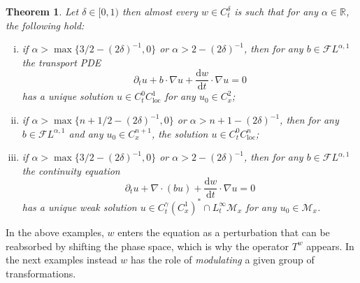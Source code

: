 \documentclass[10pt]{article}
\newcommand{\mathd}{\mathrm{d}}
\newcommand{\tmop}[1]{\ensuremath{\operatorname{#1}}}
\newcommand{\tmtextit}[1]{{\itshape{#1}}}
\newenvironment{enumerateroman}{\begin{enumerate}[i.] }{\end{enumerate}}
\newtheorem{theorem}{Theorem}
\begin{document}
\begin{theorem}
  Let $\delta \in [0, 1)$ then almost every $w \in C^{\delta}_t$ is such that
  for any $\alpha \in \mathbb{R}$, the following hold:
  \begin{enumerateroman}
    \item if $\alpha > \max \{ 3 / 2 - (2 \delta)^{- 1}, 0 \}$ or $\alpha > 2
    - (2 \delta)^{- 1}$, then for any $b \in \mathcal{F} L^{\alpha, 1}$ the
    transport PDE
    \[ \partial_t u + b \cdot \nabla u + \frac{\mathd w}{\mathd t} \cdot
       \nabla u = 0 \]
    has a unique solution $u \in C^0_t C^1_{\tmop{loc}}$ for any $u_0 \in
    C^2_x$;
    
    \item if $\alpha > \max \{ n + 1 / 2 - (2 \delta)^{- 1}, 0 \}$ or $\alpha
    > n + 1 - (2 \delta)^{- 1}$, then for any $b \in \mathcal{F} L^{\alpha,
    1}$ and any $u_0 \in C^{n + 1}_x$, the solution $u \in C^0_t
    C^n_{\tmop{loc}}$;
    
    \item if $\alpha > \max \{ 3 / 2 - (2 \delta)^{- 1}, 0 \}$ or $\alpha > 2
    - (2 \delta)^{- 1}$, then for any $b \in \mathcal{F} L^{\alpha, 1}$ the
    continuity equation
    \[ \partial_t u + \nabla \cdot (b u) + \frac{\mathd w}{\mathd t} \cdot
       \nabla u = 0 \]
    has a unique weak solution $u \in C^{\gamma}_t (C^1_x)^{\ast} \cap
    L^{\infty}_t \mathcal{M}_x$ for any $u_0 \in \mathcal{M}_x$.
  \end{enumerateroman}
\end{theorem}

In the above examples, $w$ enters the equation as a perturbation that can be
reabsorbed by shifting the phase space, which is why the operator $T^w$
appears. In the next examples instead $w$ has the role of
\tmtextit{modulating} a given group of transformations.

\
\end{document}
